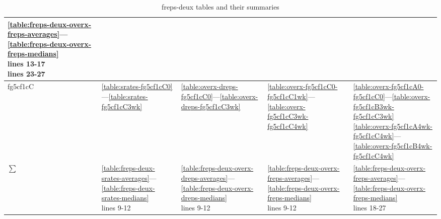 \begin{table}
\begin{tabular}{|lllll|}
\parbox[c][2cm]{3cm}{\ref{table:freps-deux-overx-freps-averages}—\ref{table:freps-deux-overx-freps-medians} \\ lines 13-17 \\ lines 23-27} \\
\hline
fg5cf1cC & 
\ref{table:srates-fg5cf1cC0}—\ref{table:srates-fg5cf1cC3wk} & 
\ref{table:overx-dreps-fg5cf1cC0}—\ref{table:overx-dreps-fg5cf1cC3wk} & 
\ref{table:overx-fg5cf1cC0-fg5cf1cC1wk}—\ref{table:overx-fg5cf1cC3wk-fg5cf1cC4wk} & 
\parbox{3cm}{\ref{table:overx-fg5cf1cA0-fg5cf1cC0}—\ref{table:overx-fg5cf1cB3wk-fg5cf1cC3wk} \\
             \ref{table:overx-fg5cf1cA4wk-fg5cf1cC4wk}—\ref{table:overx-fg5cf1cB4wk-fg5cf1cC4wk}} \\
$\sum$ & 
\parbox[c][2cm]{3cm}{\ref{table:freps-deux-srates-averages}—\ref{table:freps-deux-srates-medians} \\ lines 9-12} & 
\parbox[c][2cm]{3cm}{\ref{table:freps-deux-overx-dreps-averages}—\ref{table:freps-deux-overx-dreps-medians} \\ lines 9-12} & 
\parbox[c][2cm]{3cm}{\ref{table:freps-deux-overx-freps-averages}—\ref{table:freps-deux-overx-freps-medians} \\ lines 9-12} & 
\parbox[c][2cm]{3cm}{\ref{table:freps-deux-overx-freps-averages}—\ref{table:freps-deux-overx-freps-medians} \\ lines 18-27} \\
\hline
\bottomrule
\end{tabular}
\caption{freps-deux tables and their summaries}
\label{table:freps-deux-tables}
\end{table}
